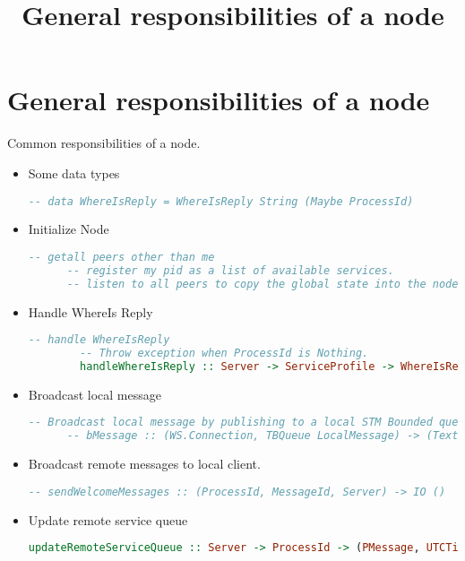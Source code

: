 \documentclass[11pt, twoside, a4paper]{article}
\begin{document}
\title{General responsibilities of a node}
\section {General responsibilities of a node}
Common responsibilities of a node.
\begin{itemize}
  \item Some data types
  \begin{lstlisting}[language=Haskell]
      -- data WhereIsReply = WhereIsReply String (Maybe ProcessId)
  \end{lstlisting}

  \item Initialize Node 
    \begin{lstlisting}[language=Haskell]
      -- getall peers other than me 
      -- register my pid as a list of available services.
      -- listen to all peers to copy the global state into the node.
    \end{lstlisting}
  \item Handle WhereIs Reply
    \begin{lstlisting}[language=Haskell]
        -- handle WhereIsReply
        -- Throw exception when ProcessId is Nothing.
        handleWhereIsReply :: Server -> ServiceProfile -> WhereIsReply -> Process ()
    \end{lstlisting}
  \item Broadcast local message 
    \begin{lstlisting}[language=Haskell]
      -- Broadcast local message by publishing to a local STM Bounded queue.
      -- bMessage :: (WS.Connection, TBQueue LocalMessage) -> (Text -> ProcessId -> LocalMessage) -> BroadcastMessageT LocalMessage
    \end{lstlisting}
  \item Broadcast remote messages to local client. 
    \begin{lstlisting}[language=Haskell]
      -- sendWelcomeMessages :: (ProcessId, MessageId, Server) -> IO ()
    \end{lstlisting}
  \item Update remote service queue
    \begin{lstlisting}[language=Haskell]
      updateRemoteServiceQueue :: Server -> ProcessId -> (PMessage, UTCTime) -> STM ProcessId
    \end{lstlisting}

\end{itemize}
\end{document}

